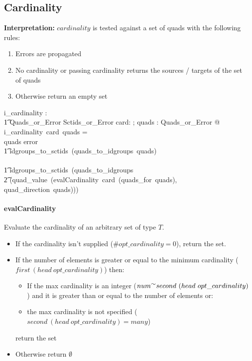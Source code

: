 \documentclass{article}
\begin{document}
\subsection{Cardinality}
\textbf{Interpretation:}
$cardinality$ is tested against a set of quads with the following rules:
\begin{enumerate}
\item Errors are propagated
\item No cardinality or passing cardinality returns  the sources / targets of the set of quads
\item Otherwise return an empty set
\end{enumerate}
\begin{gendef}
   i\_cardinality :  \\
\t1 \optional[cardinality] \fun Quads\_or\_Error \fun  Sctids\_or\_Error
\where
   \forall card: \optional[cardinality]; quads : Quads\_or\_Error  @ \\
i\_cardinality~card~quads = \\
\IF quads \in \ran error \\
\t1 \THEN idgroups\_to\_sctids~(quads\_to\_idgroups~quads) \\
\ELSE  \\
\t1 idgroups\_to\_sctids~(quads\_to\_idgroups~\\
\t2 (quad\_value~(evalCardinality~card~(quads\_for~quads), quad\_direction~quads))) 
\end{gendef}

\paragraph{evalCardinality}
Evaluate the cardinality of an arbitrary set of type $T$.  
\begin{itemize}[noitemsep,nolistsep]
\item If the cardinality isn't supplied ($\#opt\_cardinality = 0$), return the set.
\item If the number of elements is greater or equal to the minimum cardinality ($first~(head~opt\_cardinality)$) then:
\begin{itemize}[noitemsep,nolistsep]
\item If the max cardinality is an integer ($num \inv second~(head~opt\_cardinality)$) and it is greater than or equal to the number of elements or:
\item the max cardinality is not specified ($second~(head~opt\_cardinality) = many$)
\end{itemize}
return the set
\item Otherwise return $\emptyset$
\end{itemize}
\end{document}
